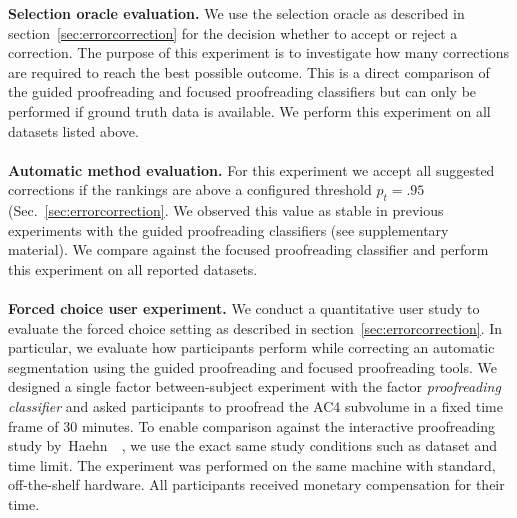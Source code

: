 \textbf{Selection oracle evaluation.} We use the selection oracle as described in section~\ref{sec:errorcorrection} for the decision whether to accept or reject a correction. The purpose of this experiment is to investigate how many corrections are required to reach the best possible outcome. This is a direct comparison of the guided proofreading and focused proofreading classifiers but can only be performed if ground truth data is available. We perform this experiment on all datasets listed above.
\\~\\
\textbf{Automatic method evaluation.} For this experiment we accept all suggested corrections if the rankings are above a configured threshold $p_t=.95$ (Sec.~\ref{sec:errorcorrection}. We observed this value as stable in previous experiments with the guided proofreading classifiers (see supplementary material). We compare against the focused proofreading classifier and perform this experiment on all reported datasets.
\\~\\
\textbf{Forced choice user experiment.} We conduct a quantitative user study to evaluate the forced choice setting as described in section~\ref{sec:errorcorrection}. In particular, we evaluate how participants perform while correcting an automatic segmentation using the guided proofreading and focused proofreading tools. We designed a single factor between-subject experiment with the factor \textit{proofreading classifier} and asked participants to proofread the AC4 subvolume in a fixed time frame of 30 minutes. To enable comparison against the interactive proofreading study by~Haehn~\etal~, we use the exact same study conditions such as dataset and time limit. The experiment was performed on the same machine with standard, off-the-shelf hardware. All participants received monetary compensation for their time.
